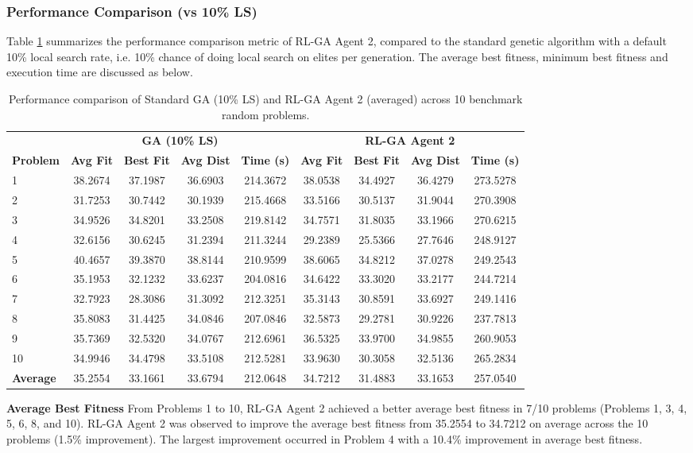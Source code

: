 \documentclass{article}
\begin{document}
\subsubsection{Performance Comparison (vs 10\% LS)}
Table \ref{tab:rlga_ga10_corrected} summarizes the performance comparison metric of RL-GA Agent 2, compared to the standard genetic algorithm with a default 10\% local search rate, i.e. 10\% chance of doing local search on elites per generation. The average best fitness, minimum best fitness and execution time are discussed as below.
\begin{table}[H]
\centering
\small
\begin{tabular}{lcccccccc}
\toprule
& \multicolumn{4}{c}{\textbf{GA (10\% LS)}} & \multicolumn{4}{c}{\textbf{RL-GA Agent 2}} \\
\cmidrule(lr){2-5} \cmidrule(lr){6-9}
\textbf{Problem} & \textbf{Avg Fit} & \textbf{Best Fit} & \textbf{Avg Dist} & \textbf{Time (s)}
& \textbf{Avg Fit} & \textbf{Best Fit} & \textbf{Avg Dist} & \textbf{Time (s)} \\
\midrule
1  & 38.2674 & 37.1987 & 36.6903 & 214.3672 & 38.0538 & 34.4927 & 36.4279 & 273.5278 \\
2  & 31.7253 & 30.7442 & 30.1939 & 215.4668 & 33.5166 & 30.5137 & 31.9044 & 270.3908 \\
3  & 34.9526 & 34.8201 & 33.2508 & 219.8142 & 34.7571 & 31.8035 & 33.1966 & 270.6215 \\
4  & 32.6156 & 30.6245 & 31.2394 & 211.3244 & 29.2389 & 25.5366 & 27.7646 & 248.9127 \\
5  & 40.4657 & 39.3870 & 38.8144 & 210.9599 & 38.6065 & 34.8212 & 37.0278 & 249.2543 \\
6  & 35.1953 & 32.1232 & 33.6237 & 204.0816 & 34.6422 & 33.3020 & 33.2177 & 244.7214 \\
7  & 32.7923 & 28.3086 & 31.3092 & 212.3251 & 35.3143 & 30.8591 & 33.6927 & 249.1416 \\
8  & 35.8083 & 31.4425 & 34.0846 & 207.0846 & 32.5873 & 29.2781 & 30.9226 & 237.7813 \\
9  & 35.7369 & 32.5320 & 34.0767 & 212.6961 & 36.5325 & 33.9700 & 34.9855 & 260.9053 \\
10 & 34.9946 & 34.4798 & 33.5108 & 212.5281 & 33.9630 & 30.3058 & 32.5136 & 265.2834 \\
\midrule
\textbf{Average} & 35.2554 & 33.1661 & 33.6794 & 212.0648 & 34.7212 & 31.4883 & 33.1653 & 257.0540 \\
\bottomrule
\end{tabular}
\caption{Performance comparison of Standard GA (10\% LS) and RL-GA Agent 2 (averaged) across 10 benchmark random problems.}
\label{tab:rlga_ga10_corrected}
\end{table}
\textbf{Average Best Fitness} \newline
From Problems 1 to 10, RL-GA Agent 2 achieved a better average best fitness in 7/10 problems (Problems 1, 3, 4, 5, 6, 8, and 10). RL-GA Agent 2 was observed to improve the average best fitness from 35.2554 to 34.7212 on average across the 10 problems (1.5\% improvement). The largest improvement occurred in Problem 4 with a 10.4\% improvement in average best fitness.
\end{document}
